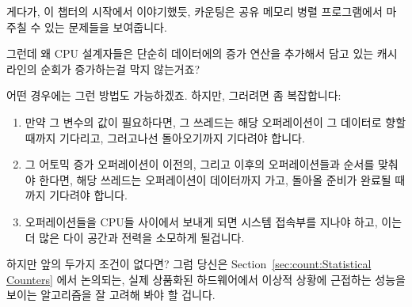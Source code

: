 \begin{enumerate}
	게다가, 이 챕터의 시작에서 이야기했듯, 카운팅은 공유 메모리 병렬
	프로그램에서 마주칠 수 있는 문제들을 보여줍니다.

\QuickQ{}
	그런데 왜 CPU 설계자들은 단순히 데이터에의 증가 연산을 추가해서
	담고 있는 캐시 라인의 순회가 증가하는걸 막지 않는거죠?

\QuickA{}
	어떤 경우에는 그런 방법도 가능하겠죠.
	하지만, 그러려면 좀 복잡합니다:

	\begin{enumerate}
	\item	만약 그 변수의 값이 필요하다면, 그 쓰레드는 해당 오퍼레이션이
		그 데이터로 향할 때까지 기다리고, 그러고나선 돌아오기까지
		기다려야 합니다.
	\item	그 어토믹 증가 오퍼레이션이 이전의, 그리고 이후의
		오퍼레이션들과 순서를 맞춰야 한다면, 해당 쓰레드는 오퍼레이션이
		데이터까지 가고, 돌아올 준비가 완료될 때까지 기다려야 합니다.
	\item	오퍼레이션들을 CPU들 사이에서 보내게 되면 시스템 접속부를
		지나야 하고, 이는 더 많은 다이 공간과 전력을 소모하게 될겁니다.

	\end{enumerate}
	하지만 앞의 두가지 조건이 없다면?
	그럼 당신은 Section~\ref{sec:count:Statistical Counters} 에서 논의되는,
	실제 상품화된 하드웨어에서 이상적 상황에 근접하는 성능을 보이는
	알고리즘을 잘 고려해 봐야 할 겁니다.
	\iffalse


\end{enumerate}
